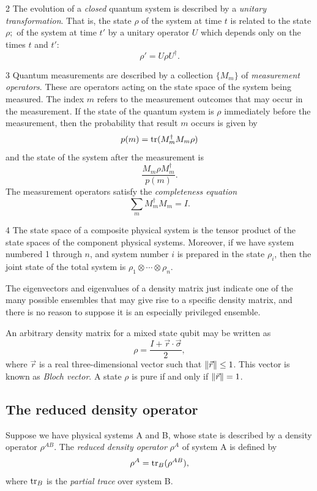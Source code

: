 \begin{postulate}{2}
    The evolution of a \emph{closed} quantum system is described by a \emph{unitary transformation}.
    That is, the state $\rho$ of the system at time $t$ is related to the state $\rho;$ of the system at time $t'$ by a unitary operator $U$ which depends only on the times $t$ and $t'$:
    \[
        \rho' = U\rho U^\dagger.
    \]
\end{postulate}

\begin{postulate}{3}
    Quantum measurements are described by a collection $\{M_m\}$ of \emph{measurement operators}.
    These are operators acting on the state space of the system being measured.
    The index $m$ refers to the measurement outcomes that may occur in the measurement.
    If the state of the quantum system is $\rho$ immediately before the measurement,
    then the probability that result $m$ occurs is given by
    \[
        p(m) = \operatorname{tr}(M_m^\dagger M_m \rho)
    \]
    and the state of the system after the measurement is
    \[
        \frac{M_m\rho M_m^\dagger}{p(m)}.
    \]
    The measurement operators satisfy the \emph{completeness equation}
    \[
        \sum_m M_m^\dagger M_m = I.
    \]
\end{postulate}

\begin{postulate}{4}
    The state space of a composite physical system is the tensor product of the state spaces of the component physical systems.
    Moreover, if we have system numbered \num{1}  through $n$, and system number $i$ is prepared in the state $\rho_i$,
    then the joint state of the total system is $\rho_1 \otimes \cdots \otimes \rho_n$.
\end{postulate}

The eigenvectors and eigenvalues of a density matrix just indicate one of the many possible ensembles that may give rise to a specific density matrix,
and there is no reason to suppose it is an especially privileged ensemble.

An arbitrary density matrix for a mixed state qubit may be written as
\[
    \rho = \frac{I + \vec{r} \cdot \vec{\sigma}}{2},
\]
where $\vec{r}$ is a real three-dimensional vector such that $\lVert\vec{r}\rVert \leq 1$.
This vector is known as \emph{Bloch vector}.
A state $\rho$ is pure if and only if $\lVert\vec{r}\rVert = 1$.

\subsection{The reduced density operator}
Suppose we have physical systems A and B, whose state is described by a density operator $\rho^{AB}$.
The \emph{reduced density operator} $\rho^A$ of system A is defined by
\[
    \rho^A = \operatorname{tr}_B(\rho^{AB}),
\]
where $\operatorname{tr}_B$ is the \emph{partial trace} over system B.

